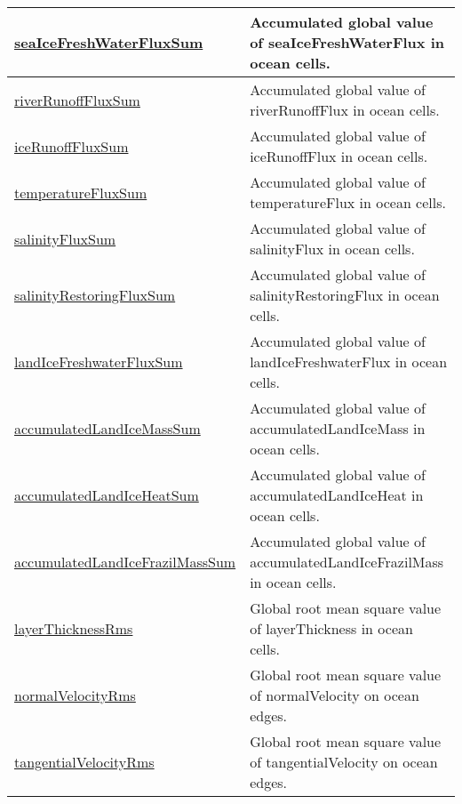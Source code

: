 {\begin{center}
\begin{longtable}{| p{2.0in} | p{4.0in} |}
    \hline
    \hyperref[subsec:var_sec_globalStatsAM_seaIceFreshWaterFluxSum]{seaIceFreshWaterFluxSum} & Accumulated global value of seaIceFreshWaterFlux in ocean cells. \\
    \hline
    \hyperref[subsec:var_sec_globalStatsAM_riverRunoffFluxSum]{riverRunoffFluxSum} & Accumulated global value of riverRunoffFlux in ocean cells. \\
    \hline
    \hyperref[subsec:var_sec_globalStatsAM_iceRunoffFluxSum]{iceRunoffFluxSum} & Accumulated global value of iceRunoffFlux in ocean cells. \\
    \hline
    \hyperref[subsec:var_sec_globalStatsAM_temperatureFluxSum]{temperatureFluxSum} & Accumulated global value of temperatureFlux in ocean cells. \\
    \hline
    \hyperref[subsec:var_sec_globalStatsAM_salinityFluxSum]{salinityFluxSum} & Accumulated global value of salinityFlux in ocean cells. \\
    \hline
    \hyperref[subsec:var_sec_globalStatsAM_salinityRestoringFluxSum]{salinityRestoringFluxSum} & Accumulated global value of salinityRestoringFlux in ocean cells. \\
    \hline
    \hyperref[subsec:var_sec_globalStatsAM_landIceFreshwaterFluxSum]{landIceFreshwaterFluxSum} & Accumulated global value of landIceFreshwaterFlux in ocean cells. \\
    \hline
    \hyperref[subsec:var_sec_globalStatsAM_accumulatedLandIceMassSum]{accumulatedLandIceMassSum} & Accumulated global value of accumulatedLandIceMass in ocean cells. \\
    \hline
    \hyperref[subsec:var_sec_globalStatsAM_accumulatedLandIceHeatSum]{accumulatedLandIceHeatSum} & Accumulated global value of accumulatedLandIceHeat in ocean cells. \\
    \hline
    \hyperref[subsec:var_sec_globalStatsAM_accumulatedLandIceFrazilMassSum]{accumulatedLandIceFrazilMass\-Sum} & Accumulated global value of accumulatedLandIceFrazilMass in ocean cells. \\
    \hline
    \hyperref[subsec:var_sec_globalStatsAM_layerThicknessRms]{layerThicknessRms} & Global root mean square value of layerThickness in ocean cells. \\
    \hline
    \hyperref[subsec:var_sec_globalStatsAM_normalVelocityRms]{normalVelocityRms} & Global root mean square value of normalVelocity on ocean edges. \\
    \hline
    \hyperref[subsec:var_sec_globalStatsAM_tangentialVelocityRms]{tangentialVelocityRms} & Global root mean square value of tangentialVelocity on ocean edges. \\

\end{longtable}
\end{center}}
